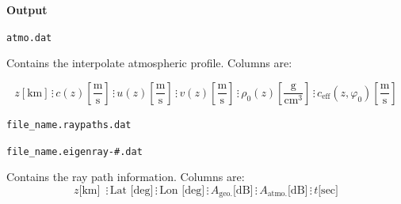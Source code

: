 \documentclass[10pt]{article}
\begin{document}
\vspace{0.01\textheight}

 \hspace{-0.25in}\textbf{Output}

	\verb=atmo.dat= 
	
	Contains the interpolate atmospheric profile.  Columns are:
	\begin{small}
	\begin{equation*}
	 z \left[ \text{km} \right] \hspace{2pt} \vdots \hspace{2pt}
	 c (z) \left[\frac{\text{m}}{\text{s}} \right] \hspace{2pt} \vdots \hspace{2pt}
	 u(z) \left[ \frac{\text{m}}{\text{s}} \right] \hspace{2pt} \vdots \hspace{2pt}
	 v(z) \left[ \frac{\text{m}}{\text{s}} \right] \hspace{2pt} \vdots \hspace{2pt}
	 \rho_0(z) \left[ \frac{\text{g}}{\text{cm}^3} \right] \hspace{2pt} \vdots \hspace{2pt}
	 c_\text{eff} \left(z, \varphi_0 \right) \left[\frac{\text{m}}{\text{s}} \right] 
	\end{equation*}
	\end{small}
	
	\vspace*{-0.01\textheight}

	\verb=file_name.raypaths.dat= 

	 \verb=file_name.eigenray-#.dat= 
	
	Contains the ray path information.  Columns are:
	\begin{equation*}
	z \text{[km] } \hspace{2pt} \vdots \hspace{2pt} 
	\text{Lat [deg]} \hspace{2pt} \vdots \hspace{2pt}
	\text{Lon [deg]} \hspace{2pt} \vdots \hspace{2pt}
	A_\text{geo.} \text{[dB]} \hspace{2pt} \vdots \hspace{2pt}
	A_\text{atmo.} \text{[dB]} \hspace{2pt} \vdots \hspace{2pt}	
	t \text{[sec]}
	\end{equation*}
\end{document}
